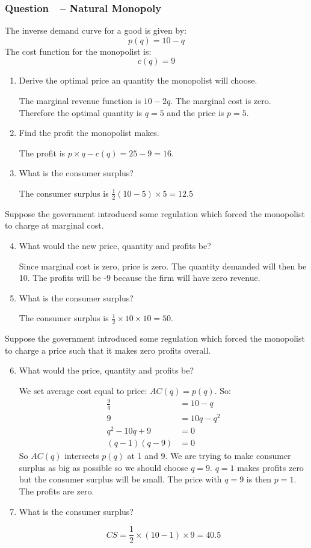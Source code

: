 \documentclass[12pt]{article}
\newcounter{question}[section]
\newcommand{\question}[1]{\refstepcounter{question}
  \subsubsection*{Question~\thequestion~-- #1}}
\newenvironment{subquestions}{
  \begin{enumerate}[label=(\roman*)]}{\end{enumerate}}
\begin{document}
\question{Natural Monopoly}
The inverse demand curve for a good is given by:
\[
  p\left( q \right)=10-q
\]
The cost function for the monopolist is:
\[
  c\left(  q\right)=9
\]
\begin{subquestions}
  \item Derive the optimal price an quantity the monopolist will choose.

    \textcolor{solution-color}{
      The marginal revenue function is $10-2q$. The marginal cost is zero.
      Therefore the optimal quantity is $q=5$ and the price is $p=5$.
    }
  \item Find the profit the monopolist makes.

    \textcolor{solution-color}{
      The profit is $p\times q - c\left( q \right) = 25 - 9=16$.
    }
  \item What is the consumer surplus?

    \textcolor{solution-color}{
      The consumer surplus is $\frac{1}{2}\left( 10-5 \right)\times 5=12.5$
    }
\end{subquestions}
Suppose the government introduced some regulation which forced the monopolist
to charge at marginal cost.
\begin{subquestions}
  \setcounter{enumi}{3}
  \item What would the new price, quantity and profits be?

    \textcolor{solution-color}{
       Since marginal cost is zero, price is zero. The quantity demanded will
       then be 10. The profits will be -9 because the firm will have zero
       revenue.
    }
  \item What is the consumer surplus?

    \textcolor{solution-color}{
      The consumer surplus is $\frac{1}{2}\times 10 \times 10 = 50$.
    }
\end{subquestions}
Suppose the government introduced some regulation which forced the monopolist
to charge a price such that it makes zero profits overall.
\begin{subquestions}
  \setcounter{enumi}{5}
  \item What would the price, quantity and profits be?

    \textcolor{solution-color}{
      We set average cost equal to price: $AC\left( q \right)=p\left( q
      \right)$.
      So:
      \begin{align*}
        \frac{9}{q} & =10-q \\
        9 &=10q - q^2 \\
        q^2 - 10q + 9 &= 0 \\
        \left( q-1 \right)\left( q-9 \right)&=0
      \end{align*}
      So $AC\left( q \right)$ intersects $p\left( q \right)$ at 1 and 9. We are
      trying to make consumer surplus as big as possible so we should choose
      $q=9$. $q=1$ makes profits zero but the consumer surplus will be small.
      The price with $q=9$ is then $p=1$. The profits are zero.
    }
  \item What is the consumer surplus?

    \textcolor{solution-color}{
      \[
        CS=\frac{1}{2}\times \left( 10-1 \right)\times 9 = 40.5
      \]
    }
\end{subquestions}
\end{document}
